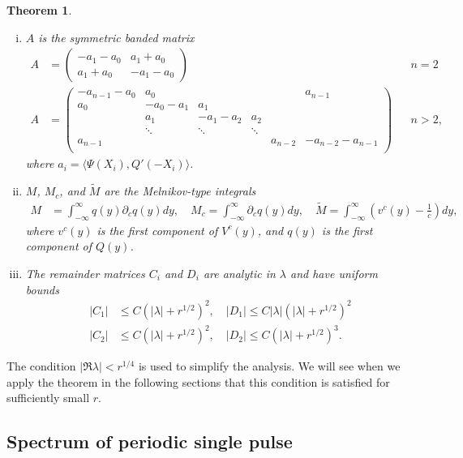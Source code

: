 \documentclass[12pt]{elsarticle}
\theoremstyle{plain}
\newtheorem{theorem}{Theorem}
\theoremstyle{definition}
\theoremstyle{remark}
\numberwithin{theorem}{section}
\numberwithin{equation}{section}
\begin{document}
\begin{theorem}
\begin{enumerate}[(i)]
\item $A$ is the symmetric banded matrix
\begin{align}\label{Asymm}
A &= \begin{pmatrix}
-a_1 - a_0 & a_1 + a_0 \\
a_1 + a_0 & - a_1 - a_0 
\end{pmatrix} && n = 2 \\
A &= \begin{pmatrix}
-a_{n-1} - a_0 & a_0 & & &  & a_{n-1}\\
a_0 & -a_0 - a_1 &  a_1 \\
& a_1 & -a_1 - a_2 &  a_2 \\
& \ddots & \ddots & \ddots \\
a_{n-1} & & & & a_{n-2} & -a_{n-2} - a_{n-1} \\
\end{pmatrix} && n > 2,
\end{align}
where $a_i = \langle \Psi(X_i), Q'(-X_i) \rangle$.

\item $M$, $M_c$, and $\tilde{M}$ are the Melnikov-type integrals
\begin{align*}
M &= \int_{-\infty}^\infty q(y) \partial_c q(y) dy, \quad
M_c = \int_{-\infty}^\infty \partial_c q(y) dy, \quad
\tilde{M} = \int_{-\infty}^{\infty} \left(v^c(y) - \frac{1}{c}\right) dy,
\end{align*}
where $v^c(y)$ is the first component of $V^c(y)$, and $q(y)$ is the first component of $Q(y)$.

\item The remainder matrices $C_i$ and $D_i$ are analytic in $\lambda$ and have uniform bounds
\begin{align*}
|C_1| &\leq C (|\lambda| + r^{1/2})^2, \quad
|D_1| \leq C |\lambda|(|\lambda| + r^{1/2})^2 \\
|C_2| &\leq C (|\lambda| + r^{1/2})^2, \quad
|D_2| \leq C (|\lambda| + r^{1/2})^3.
\end{align*}
\end{enumerate}
\end{theorem}

\noi The condition $|\Re \lambda| < r^{1/4}$ is used to simplify the analysis. We will see when we apply the theorem in the following sections that this condition is satisfied for sufficiently small $r$.

\subsection{Spectrum of periodic single pulse}\label{sec:persingle}
\end{document}
